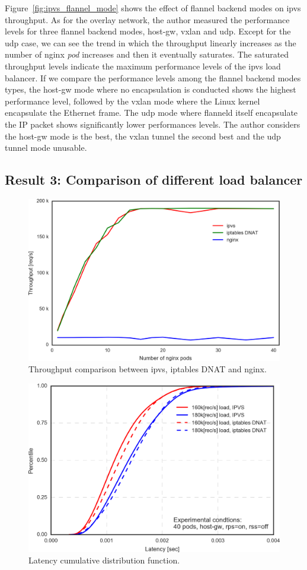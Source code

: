 Figure~\ref{fig:ipvs_flannel_mode} shows the effect of flannel backend modes on ipvs throughput.
As for the overlay network, the author measured the performance levels for three flannel backend modes, host-gw, vxlan and udp.
Except for the udp case, we can see the trend in which the throughput linearly increases 
as the number of nginx {\em pod} increases and then it eventually saturates.
The saturated throughput levels indicate the maximum performance levels of the ipvs load balancer.
If we compare the performance levels among the flannel backend modes types, 
the host-gw mode where no encapsulation is conducted shows the highest performance level,
followed by the vxlan mode where the Linux kernel encapsulate the Ethernet frame.
The udp mode where flanneld itself encapsulate the IP packet shows significantly lower performances levels.
The author considers the host-gw mode is the best, the vxlan tunnel the second best and the udp tunnel mode unusable.

\FloatBarrier

\subsection{Result 3: Comparison of different load balancer}

\begin{figure}[htb]
  \centering
  \includegraphics[width=0.8\columnwidth]{Figs/ipvs-iptables-nginx}
  \caption{Throughput comparison between ipvs, iptables DNAT and nginx.}
  \label{fig:ipvs-iptables-nginx}
\end{figure}

\begin{figure}[htb]
  \centering
  \includegraphics[width=0.8\columnwidth]{Figs/latency_cdf_rps_40pods}
  \caption{Latency cumulative distribution function.}
  \label{fig:latency_cdf_rps_40pods}
\end{figure}

